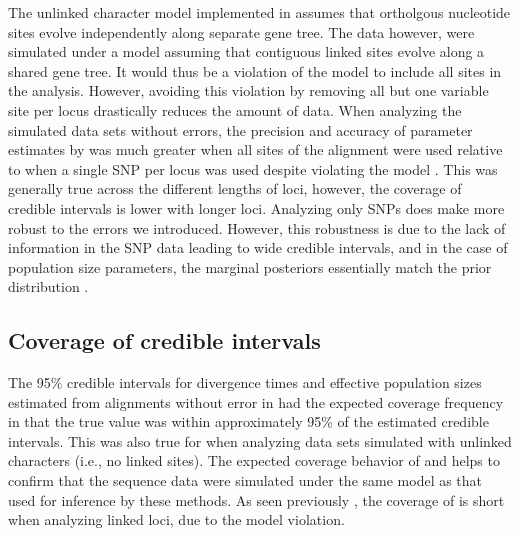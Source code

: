 The unlinked character model implemented in \ecoevolity assumes that ortholgous 
nucleotide sites evolve independently along separate gene tree. The data however, were
simulated under a model assuming that contiguous linked sites evolve along a shared 
gene tree. It would thus be a violation of the \ecoevolity model to include all
sites in the analysis.
However, avoiding this violation by removing all but one variable site per
locus drastically reduces the amount of data.    
When analyzing the simulated data sets without errors, the precision and accuracy of
parameter estimates by \ecoevolity was much greater
when all sites of the alignment were used relative to when a single SNP per 
locus was used despite violating the model \mainfigsp.
This was generally true across the different lengths of loci, however, the
coverage of credible intervals is lower with longer loci.
Analyzing only SNPs does make \ecoevolity more robust to the errors
we introduced.
However, this robustness is due to the lack of information in the
SNP data leading to wide credible intervals, and in the case of
population size parameters, the marginal posteriors essentially
match the prior distribution \thetafigsp.





\subsection{Coverage of credible intervals}
The 95\% credible intervals for divergence times and effective population sizes
estimated from alignments without error in \beast had the expected coverage
frequency in that the true value was within approximately 95\% of the estimated
credible intervals. 
This was also true for \ecoevolity when analyzing data sets simulated with
unlinked characters (i.e., no linked sites).
The expected coverage behavior of \beast and \ecoevolity helps to confirm that
the sequence data were simulated under the same model as that used for
inference by these methods. 
As seen previously \citep{Oaks2018ecoevolity}, the coverage of \ecoevolity is
short when analyzing linked loci, due to the model violation.

